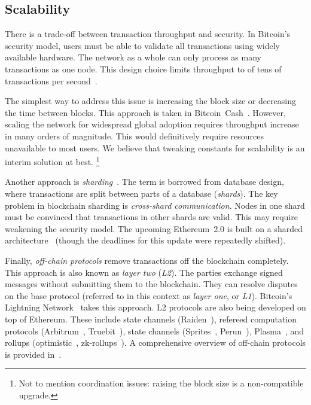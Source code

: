 \subsection{Scalability}

There is a trade-off between transaction throughput and security.
In Bitcoin's security model, users must be able to validate all transactions using widely available hardware.
The network as a whole can only process as many transactions as one node.
This design choice limits throughput to of tens of transactions per second~\cite{Croman2016}.

The simplest way to address this issue is increasing the block size or decreasing the time between blocks.
This approach is taken in Bitcoin~Cash~\cite{Kwon2019}.
However, scaling the network for widespread global adoption requires throughput increase in many orders of magnitude.
This would definitively require resources unavailable to most users.
We believe that tweaking constants for scalability is an interim solution at best.
\footnote{Not to mention coordination issues: raising the block size is a non-compatible upgrade.}

Another approach is \textit{sharding}~\cite{Gencer2016, Luu2016a}.
The term is borrowed from database design, where transactions are split between parts of a database (\textit{shards}).
The key problem in blockchain sharding is \textit{cross-shard communication}.
Nodes in one shard must be convinced that transactions in other shards are valid.
This may require weakening the security model.
The upcoming Ethereum~2.0 is built on a sharded architecture~\cite{ShardingFAQ} (though the deadlines for this update were repeatedly shifted).

Finally, \textit{off-chain protocols} remove transactions off the blockchain completely.
This approach is also known as \textit{layer two} (\textit{L2}).
The parties exchange signed messages without submitting them to the blockchain.
They can resolve disputes on the base protocol (referred to in this context as \textit{layer one}, or \textit{L1}).
Bitcoin's Lightning Network~\cite{Poon2016} takes this approach.
L2 protocols are also being developed on top of Ethereum.
These include state channels (Raiden~\cite{RaidenWebsite}), refereed computation protocols (Arbitrum~\cite{Kalodner2018}, Truebit~\cite{Teutsch2017}), state channels (Sprites~\cite{Miller2019}, Perun~\cite{Dziembowski2017}), Plasma~\cite{Poon2017}, and rollups (optimistic~\cite{Floersch2019}, zk-rollups~\cite{Gluchowski2019}).
A comprehensive overview of off-chain protocols is provided in~\cite{Gudgeon2019}.


